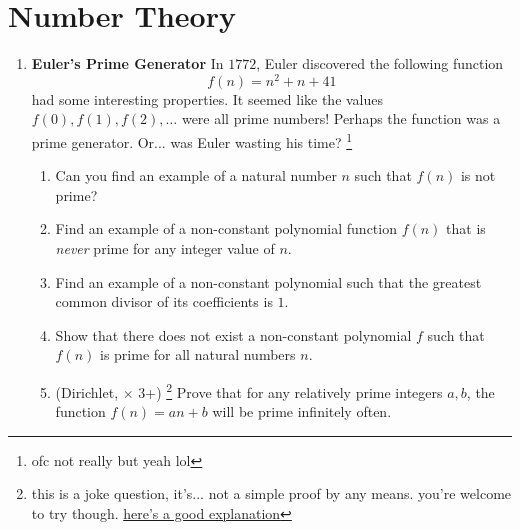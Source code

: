 \documentclass[11pt]{scrartcl}
\begin{document}
\section{Number Theory}
\begin{enumerate}[label=\textbf{N\arabic*}.]
    \item \textbf{Euler's Prime Generator} \newline
    In $1772$, Euler discovered the following function
    \[ f(n) = n^2 + n + 41 \]
    had some interesting properties. It seemed like the values $f(0), f(1), f(2), \dots$ were all prime numbers! Perhaps the function was a prime generator. Or... was Euler wasting his time? \footnote{ofc not really but yeah lol}
    
    \begin{enumerate}
        \item Can you find an example of a natural number $n$ such that $f(n)$ is not prime?

        \item Find an example of a non-constant polynomial function $f(n)$ that is \emph{never} prime for any integer value of $n$.

        \item Find an example of a non-constant polynomial such that the greatest common divisor of its coefficients is $1$.
        
        \item Show that there does not exist a non-constant polynomial $f$ such that $f(n)$ is prime for all natural numbers $n$.
        
        \item (Dirichlet, \fullchili \hspace{1pt} $\times$ 3+) \footnote{this is a joke question, it's... not a simple proof by any means. you're welcome to try though. \href{https://math.rice.edu/~av15/Files/Dirichlet.pdf}{here's a good explanation}} Prove that for any relatively prime integers $a, b$, the function $f(n) = an + b$ will be prime infinitely often.
    \end{enumerate}
\end{enumerate}
\end{document}
